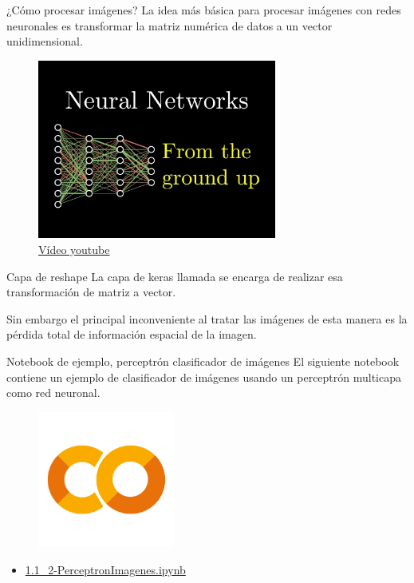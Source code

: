 \begin{frame}{¿Cómo procesar imágenes?}
La idea más \alert{básica} para procesar imágenes con redes neuronales es  transformar la \alert{matriz numérica} de datos a un \alert{vector unidimensional}.

\begin{figure}
    \centering
    \includegraphics[width=0.7\textwidth]{Slides/figures/Tema 3/NNVideo.jpg}
    \caption{\href{https://www.youtube.com/watch?v=aircAruvnKk&t=218s}{Vídeo youtube}}
\end{figure}
\end{frame}

\begin{frame}{Capa de reshape}
La capa de \alert{keras} llamada  se encarga de realizar esa transformación de \alert{matriz} a \alert{vector}.

Sin embargo el principal \alert{inconveniente} al tratar las imágenes de esta manera es la \alert{pérdida total} de información espacial de la imagen.
\end{frame}


\begin{frame}{Notebook de ejemplo, perceptrón clasificador de imágenes}
El siguiente notebook contiene un ejemplo de clasificador de imágenes usando un perceptrón multicapa como red neuronal.

\begin{figure}
    \centering
    \includegraphics[width=0.4\textwidth]{Slides/figures/GoogleColab.png}
\end{figure}
\begin{itemize}
    \centering
    \item {\Large \href{https://colab.research.google.com/drive/1h2cas9zCyUsutVJrJwR43zJMzOurunoV?usp=sharing}{1.1\_2-PerceptronImagenes.ipynb}}
\end{itemize}
\end{frame}

